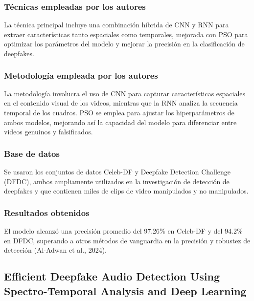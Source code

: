 \subsubsection{Técnicas empleadas por los autores}
La técnica principal incluye una combinación híbrida de CNN y RNN para extraer características tanto espaciales como temporales, mejorada con PSO para optimizar los parámetros del modelo y mejorar la precisión en la clasificación de deepfakes.

\subsubsection{Metodología empleada por los autores}
La metodología involucra el uso de CNN para capturar características espaciales en el contenido visual de los videos, mientras que la RNN analiza la secuencia temporal de los cuadros. PSO se emplea para ajustar los hiperparámetros de ambos modelos, mejorando así la capacidad del modelo para diferenciar entre videos genuinos y falsificados.

\subsubsection{Base de datos}
Se usaron los conjuntos de datos Celeb-DF y Deepfake Detection Challenge (DFDC), ambos ampliamente utilizados en la investigación de detección de deepfakes y que contienen miles de clips de video manipulados y no manipulados.

\subsubsection{Resultados obtenidos}
El modelo alcanzó una precisión promedio del 97.26\% en Celeb-DF y del 94.2\% en DFDC, superando a otros métodos de vanguardia en la precisión y robustez de detección (Al-Adwan et al., 2024).

\subsection{Efficient Deepfake Audio Detection Using Spectro-Temporal Analysis and Deep Learning \citep*{pr_dehghani2018copper}}

